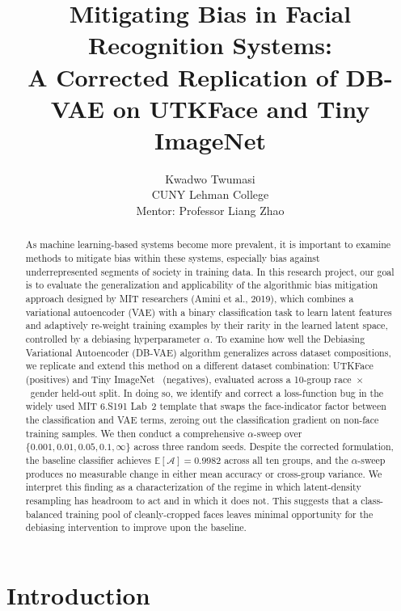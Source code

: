 \documentclass[10pt,twocolumn]{article}
\title{\vspace{-2em}Mitigating Bias in Facial Recognition Systems:\\
A Corrected Replication of DB-VAE on UTKFace and Tiny ImageNet}
\author{Kwadwo Twumasi \\ CUNY Lehman College \\ Mentor: Professor Liang Zhao}
\date{}
\begin{document}
\maketitle
\begin{abstract}
{\normalsize
\noindent
As machine learning-based systems become more prevalent, it is important to examine methods to mitigate bias within these systems, especially bias against underrepresented segments of society in training data.
In this research project, our goal is to evaluate the generalization and applicability of the algorithmic bias mitigation approach designed by MIT researchers (Amini et al., 2019), which combines a variational autoencoder (VAE) with a binary classification task to learn latent features and adaptively re-weight training examples by their rarity in the learned latent space, controlled by a debiasing hyperparameter $\alpha$.
To examine how well the Debiasing Variational Autoencoder (DB-VAE) algorithm generalizes across dataset compositions, we replicate and extend this method on a different dataset combination: UTKFace~\cite{zhang2017utkface} (positives) and Tiny ImageNet~\cite{le2015tinyimagenet} (negatives), evaluated across a 10-group race~$\times$~gender held-out split.
In doing so, we identify and correct a loss-function bug in the widely used MIT 6.S191 Lab~2 template that swaps the face-indicator factor between the classification and VAE terms, zeroing out the classification gradient on non-face training samples.
We then conduct a comprehensive $\alpha$-sweep over $\{0.001, 0.01, 0.05, 0.1, \infty\}$ across three random seeds.
Despite the corrected formulation, the baseline classifier achieves $\mathbb{E}[\mathcal{A}] = 0.9982$ across all ten groups, and the $\alpha$-sweep produces no measurable change in either mean accuracy or cross-group variance.
We interpret this finding as a characterization of the regime in which latent-density resampling has headroom to act and in which it does not.
This suggests that a class-balanced training pool of cleanly-cropped faces leaves minimal opportunity for the debiasing intervention to improve upon the baseline.
}
    \end{abstract}

\section{Introduction}
\end{document}
